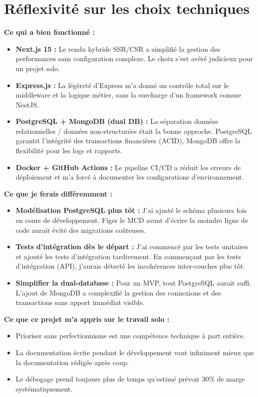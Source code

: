 \section{Réflexivité sur les choix techniques}

\begin{tcolorbox}[colback=blue!5!white,colframe=blue!60!black,title=\textbf{Retour critique sur les choix de stack}]
\textbf{Ce qui a bien fonctionné :}
\begin{itemize}
    \item \textbf{Next.js 15 :} Le rendu hybride SSR/CSR a simplifié la gestion des performances sans configuration complexe. Le choix s'est avéré judicieux pour un projet solo.
    \item \textbf{Express.js :} La légèreté d'Express m'a donné un contrôle total sur le middleware et la logique métier, sans la surcharge d'un framework comme NestJS.
    \item \textbf{PostgreSQL + MongoDB (dual DB) :} La séparation données relationnelles / données non-structurées était la bonne approche. PostgreSQL garantit l'intégrité des transactions financières (ACID), MongoDB offre la flexibilité pour les logs et rapports.
    \item \textbf{Docker + GitHub Actions :} Le pipeline CI/CD a réduit les erreurs de déploiement et m'a forcé à documenter les configurations d'environnement.
\end{itemize}

\textbf{Ce que je ferais différemment :}
\begin{itemize}
    \item \textbf{Modélisation PostgreSQL plus tôt :} J'ai ajusté le schéma plusieurs fois en cours de développement. Figer le MCD avant d'écrire la moindre ligne de code aurait évité des migrations coûteuses.
    \item \textbf{Tests d'intégration dès le départ :} J'ai commencé par les tests unitaires et ajouté les tests d'intégration tardivement. En commençant par les tests d'intégration (API), j'aurais détecté les incohérences inter-couches plus tôt.
    \item \textbf{Simplifier la dual-database :} Pour un MVP, tout PostgreSQL aurait suffi. L'ajout de MongoDB a complexifié la gestion des connexions et des transactions sans apport immédiat visible.
\end{itemize}

\textbf{Ce que ce projet m'a appris sur le travail solo :}
\begin{itemize}
    \item Prioriser sans perfectionnisme est une compétence technique à part entière.
    \item La documentation écrite pendant le développement vaut infiniment mieux que la documentation rédigée après coup.
    \item Le débogage prend toujours plus de temps qu'estimé  prévoir 30\% de marge systématiquement.
\end{itemize}
\end{tcolorbox}

